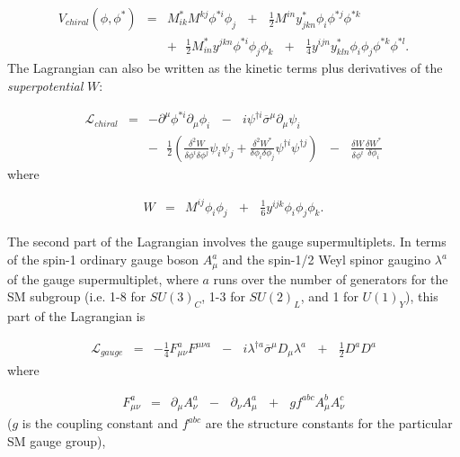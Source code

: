 \documentclass[dissertation.tex]{subfiles}
\begin{document}
\begin{eqnarray}
\label{eq:V_chiral}
V_{chiral}(\phi, \phi^{*}) &=& M_{ik}^{*}M^{kj}\phi^{*i}\phi_{j}\mbox{ }+\mbox{ }\frac{1}{2}M^{in}y_{jkn}^{*}\phi_{i}\phi^{*j}\phi^{*k}\mbox{ }\nonumber \\
&&+\mbox{ }\frac{1}{2}M_{in}^{*}y^{jkn}\phi^{*i}\phi_{j}\phi_{k}\mbox{ }+\mbox{ }\frac{1}{4}y^{ijn}y_{kln}^{*}\phi_{i}\phi_{j}\phi^{*k}\phi^{*l}.
\end{eqnarray}
%
The Lagrangian can also be written as the kinetic terms plus derivatives of the \textit{superpotential} $W$:

\begin{eqnarray}
\label{eq:L_chiral_W}
\mathcal{L}_{chiral} &=& -\partial^{\mu}\phi^{*i}\partial_{\mu}\phi_{i}\mbox{ }-\mbox{ }i\psi^{\dag i}\overline{\sigma}^{\mu}\partial_{\mu}\psi_{i}\mbox{ }\nonumber \\
&&-\mbox{ }\frac{1}{2}(\frac{\delta^{2}W}{\delta\phi^{i}\delta\phi^{j}}\psi_{i}\psi_{j} + \frac{\delta^{2}W^{*}}{\delta\phi_{i}\delta\phi_{j}}\psi^{\dag i}\psi^{\dag j})\mbox{ }-\mbox{ }\frac{\delta W}{\delta\phi^{i}}\frac{\delta W^{*}}{\delta\phi_{i}}
\end{eqnarray}
%
where

\begin{eqnarray}
\label{eq:W}
W &=& M^{ij}\phi_{i}\phi_{j}\mbox{ }+\mbox{ }\frac{1}{6}y^{ijk}\phi_{i}\phi_{j}\phi_{k}.
\end{eqnarray}

The second part of the Lagrangian involves the gauge supermultiplets.  In terms of the spin-1 ordinary gauge boson $A_{\mu}^{a}$ and the spin-1/2 Weyl spinor gaugino $\lambda^{a}$ of the gauge supermultiplet, where $a$ runs over the number of generators for the SM subgroup (i.e. 1-8 for $SU(3)_{C}$, 1-3 for $SU(2)_{L}$, and 1 for $U(1)_{Y}$), this part of the Lagrangian is

\begin{eqnarray}
\label{eq:L_gauge}
\mathcal{L}_{gauge} &=& -\frac{1}{4}F_{\mu\nu}^{a}F^{\mu\nu a}\mbox{ }-\mbox{ }i\lambda^{\dag a}\overline{\sigma}^{\mu}D_{\mu}\lambda^{a}\mbox{ }+\mbox{ }\frac{1}{2}D^{a}D^{a}
\end{eqnarray}
%
where 

\begin{eqnarray}
\label{eq:F}
F_{\mu\nu}^{a} &=& \partial_{\mu}A_{\nu}^{a}\mbox{ }-\mbox{ }\partial_{\nu}A_{\mu}^{a}\mbox{ }+\mbox{ }gf^{abc}A_{\mu}^{b}A_{\nu}^{c}
\end{eqnarray}
%
($g$ is the coupling constant and $f^{abc}$ are the structure constants for the particular SM gauge group), 
\end{document}
